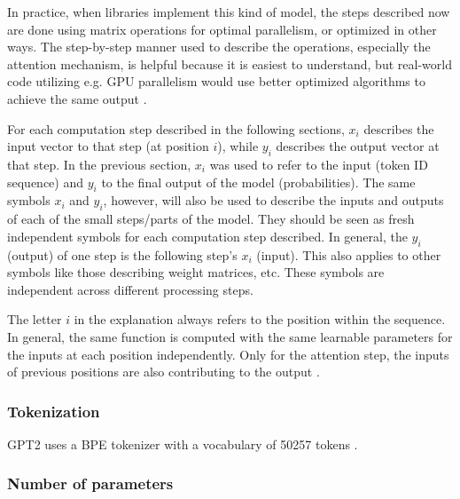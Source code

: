 In practice, when libraries implement this kind of model, the steps described now are done using matrix operations
for optimal parallelism, or optimized in other ways. The step-by-step manner used to describe the operations,
especially the attention mechanism, is helpful because it is easiest to understand, but real-world code
utilizing e.g. GPU parallelism would use better optimized algorithms to achieve the same output \cite{choi2023unleashing} . 

For each computation step described in the following sections, $x_i$ describes the input vector to that step (at position $i$), while $y_i$ describes the output vector
at that step. In the previous section, $x_i$ was used to refer to the input (token ID sequence) and $y_i$ to the final output of the model (probabilities).
The same symbols $x_i$ and $y_i$, however, will also be used to describe the inputs and outputs of each of the small steps/parts of the model.
They should be seen as fresh independent symbols for each computation step described. In general, the $y_i$ (output) of one step is the following step's $x_i$ (input).
This also applies to other symbols like those describing weight matrices, etc. These symbols are independent across different processing steps.

The letter $i$ in the explanation always refers to the position within the sequence. In general, the same function is computed with the same learnable parameters
for the inputs at each position independently. Only for the attention step, the inputs of previous positions are also contributing to the output \cite{alammar-gpt2}.

\subsubsection{Tokenization}


\label{gpt2:tokenizer}

GPT2 uses a BPE tokenizer with a vocabulary of 50257 tokens  \cite{HuggingFaceGPT2}.

\subsubsection{Number of parameters}

\label{gpt2:parameters}

